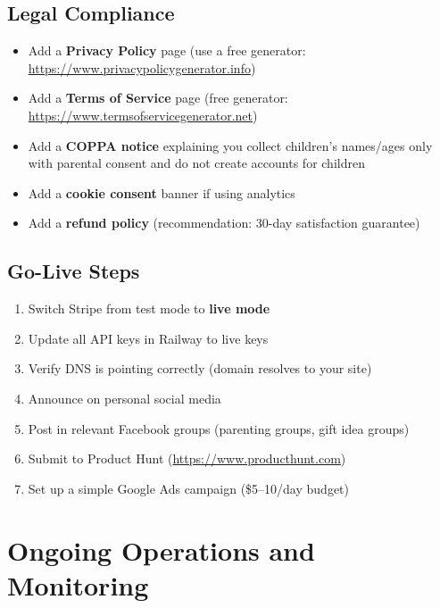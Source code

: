 \documentclass[12pt, letterpaper, oneside]{book}
\begin{document}
\section{Legal Compliance}

\begin{itemize}[leftmargin=2em, itemsep=4pt]
  \item[$\square$] Add a \textbf{Privacy Policy} page (use a free generator: \url{https://www.privacypolicygenerator.info})
  \item[$\square$] Add a \textbf{Terms of Service} page (free generator: \url{https://www.termsofservicegenerator.net})
  \item[$\square$] Add a \textbf{COPPA notice} explaining you collect children's names/ages only with parental consent and do not create accounts for children
  \item[$\square$] Add a \textbf{cookie consent} banner if using analytics
  \item[$\square$] Add a \textbf{refund policy} (recommendation: 30-day satisfaction guarantee)
\end{itemize}

\section{Go-Live Steps}

\begin{enumerate}[leftmargin=2em, itemsep=4pt]
  \item Switch Stripe from test mode to \textbf{live mode}
  \item Update all API keys in Railway to live keys
  \item Verify DNS is pointing correctly (domain resolves to your site)
  \item Announce on personal social media
  \item Post in relevant Facebook groups (parenting groups, gift idea groups)
  \item Submit to Product Hunt (\url{https://www.producthunt.com})
  \item Set up a simple Google Ads campaign (\$5--10/day budget)
\end{enumerate}


\chapter{Ongoing Operations and Monitoring}
\end{document}
